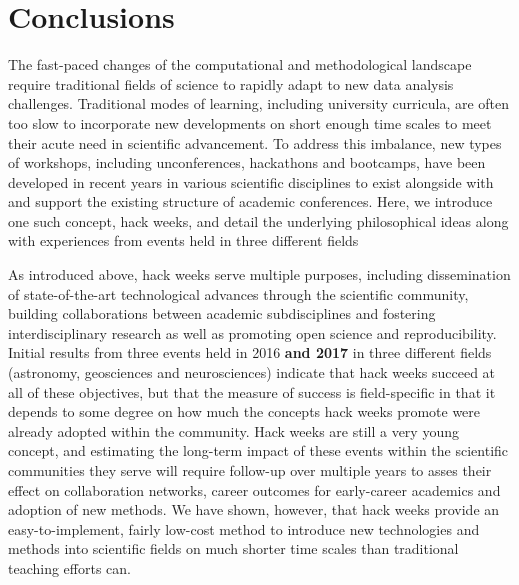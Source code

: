 
\section*{Conclusions}

The fast-paced changes of the computational and methodological landscape require traditional fields of science to rapidly adapt to new data analysis challenges.
Traditional modes of learning, including university curricula, are often too slow to incorporate new developments on short enough time scales to meet their acute need in scientific advancement.
To address this imbalance, new types of workshops, including unconferences, hackathons and bootcamps, have been developed in recent years in various scientific disciplines to exist alongside with and support the existing structure of academic conferences.
Here, we introduce one such concept, hack weeks, and detail the underlying philosophical ideas along with experiences from events held in three different fields

As introduced above, hack weeks serve multiple purposes, including dissemination of state-of-the-art technological advances through the scientific community, building collaborations between academic subdisciplines and fostering interdisciplinary research as well as  promoting open science and reproducibility.
Initial results from three events held in 2016 \textbf{and 2017} in three different fields (astronomy, geosciences and neurosciences) indicate that hack weeks succeed at all of these objectives, but that the measure of success is field-specific in that it depends to some degree on how much the concepts hack weeks promote were already adopted within the community.
Hack weeks are still a very young concept, and estimating the long-term impact of these events within the scientific communities they serve will require follow-up over multiple years to asses their effect on collaboration networks, career outcomes for early-career academics and adoption of new methods.
We have shown, however, that hack weeks provide an easy-to-implement, fairly low-cost method to introduce new technologies and methods into scientific fields on much shorter time scales than traditional teaching efforts can.
